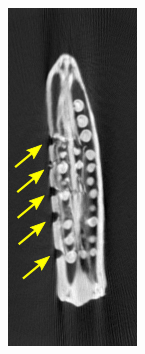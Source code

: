 \documentclass[journal]{IEEEtran}
\begin{document}
\begin{figure}[!h]
\begin{subfigure}[b]{0.18\linewidth}
\captionsetup{labelformat=empty}
        \caption{}
  \end{subfigure}
  \begin{subfigure}[b]{0.18\linewidth}
        \includegraphics[width=\textwidth]{../images/okra/template3_marked.png}

\end{subfigure}
\end{figure}
\end{document}
